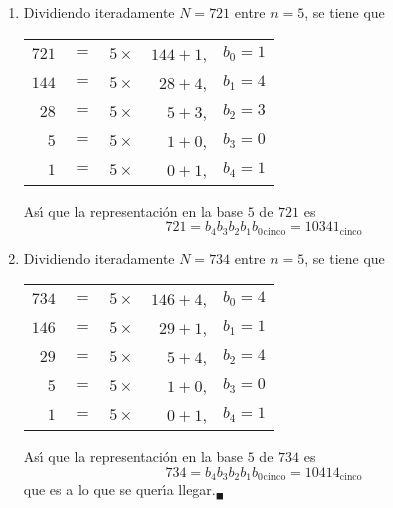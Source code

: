 \begin{solucion}
\begin{enumerate}
  \item Dividiendo iteradamente $N=721$ entre $n=5$, se tiene que
  \begin{center}
   \begin{tabular}{rclrr}
    $721$ & $=$ & $5\times$ & $144 + 1$, & $b_0 = 1$ \\
    $144$ & $=$ & $5\times$ & $28 + 4$, & $b_1 = 4$ \\
    $28$  & $=$ & $5\times$ & $5 + 3$, & $b_2 = 3$ \\
    $5$  & $=$ & $5\times$ & $1 + 0$, & $b_3 = 0$ \\
    $1$  & $=$ & $5\times$ & $0 + 1$, & $b_4 = 1$ 
   \end{tabular}
  \end{center}
  As\'{\i} que la representaci\'on en la base $5$ de $721$ es
  \begin{equation*}
   721 = b_4b_3b_2b_1b_0{}_{\text{cinco}} = 10341_{\text{cinco}}
  \end{equation*}

  \item Dividiendo iteradamente $N=734$ entre $n=5$, se tiene que
  \begin{center}
   \begin{tabular}{rclrr}
    $734$ & $=$ & $5\times$ & $146 + 4$, & $b_0 = 4$ \\
    $146$ & $=$ & $5\times$ & $29 + 1$, & $b_1 = 1$ \\
    $29$  & $=$ & $5\times$ & $5 + 4$, & $b_2 = 4$ \\
    $5$  & $=$ & $5\times$ & $1 + 0$, & $b_3 = 0$ \\
    $1$  & $=$ & $5\times$ & $0 + 1$, & $b_4 = 1$ 
   \end{tabular}
  \end{center}
  As\'{\i} que la representaci\'on en la base $5$ de $734$ es
  \begin{equation*}
   734 = b_4b_3b_2b_1b_0{}_{\text{cinco}} = 10414_{\text{cinco}}
  \end{equation*}
  que es a lo que se quer\'{\i}a llegar.${}_{\blacksquare}$
 \end{enumerate}
\end{solucion}
